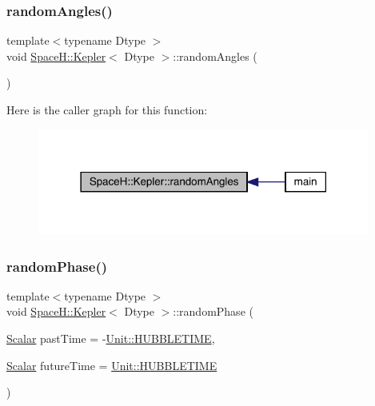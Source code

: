 \subsubsection{\texorpdfstring{random\+Angles()}{randomAngles()}}
{\footnotesize\ttfamily template$<$typename Dtype $>$ \\
void \mbox{\hyperlink{struct_space_h_1_1_kepler}{Space\+H\+::\+Kepler}}$<$ Dtype $>$\+::random\+Angles (\begin{DoxyParamCaption}{ }\end{DoxyParamCaption})\hspace{0.3cm}{\ttfamily [inline]}}

Here is the caller graph for this function\+:
\nopagebreak
\begin{figure}[H]
\begin{center}
\leavevmode
\includegraphics[width=310pt]{struct_space_h_1_1_kepler_ac8d49ec22dd42341e73a289a818ae0ac_icgraph}
\end{center}
\end{figure}
\mbox{\label{struct_space_h_1_1_kepler_a7a21a6bad2fda19e9d93e023c8879c42}} 
\subsubsection{\texorpdfstring{random\+Phase()}{randomPhase()}}
{\footnotesize\ttfamily template$<$typename Dtype $>$ \\
void \mbox{\hyperlink{struct_space_h_1_1_kepler}{Space\+H\+::\+Kepler}}$<$ Dtype $>$\+::random\+Phase (\begin{DoxyParamCaption}\item[{\mbox{\hyperlink{struct_space_h_1_1_kepler_a19291f268209f594a96fb4828fa1a54c}{Scalar}}}]{past\+Time = {\ttfamily -\/\mbox{\hyperlink{namespace_space_h_1_1_unit_af26bad8094a2c37c5b9932d9c40baaac}{Unit\+::\+H\+U\+B\+B\+L\+E\+T\+I\+ME}}},  }\item[{\mbox{\hyperlink{struct_space_h_1_1_kepler_a19291f268209f594a96fb4828fa1a54c}{Scalar}}}]{future\+Time = {\ttfamily \mbox{\hyperlink{namespace_space_h_1_1_unit_af26bad8094a2c37c5b9932d9c40baaac}{Unit\+::\+H\+U\+B\+B\+L\+E\+T\+I\+ME}}} }\end{DoxyParamCaption})\hspace{0.3cm}{\ttfamily [inline]}}

